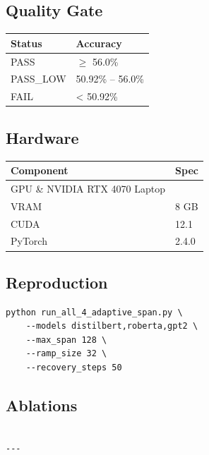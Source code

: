 \subsection{Quality Gate}

\begin{table}[H]
\centering
\small
\begin{tabular}{ll}
\toprule
\textbf{Status} & \textbf{Accuracy} \\
\midrule
PASS & $\ge$ 56.0\% \\
PASS\_LOW & 50.92\% -- 56.0\% \\
FAIL & < 50.92\% \\
\bottomrule
\end{tabular}
\end{table}

\subsection{Hardware}

\begin{table}[H]
\centering
\small
\begin{tabular}{ll}
\toprule
\textbf{Component} & \textbf{Spec} \\
\midrule
GPU \& NVIDIA RTX 4070 Laptop \\
VRAM & 8 GB \\
CUDA & 12.1 \\
PyTorch & 2.4.0 \\
\bottomrule
\end{tabular}
\end{table}

\subsection{Reproduction}

\begin{lstlisting}
python run_all_4_adaptive_span.py \
    --models distilbert,roberta,gpt2 \
    --max_span 128 \
    --ramp_size 32 \
    --recovery_steps 50
\end{lstlisting}

\subsection{Ablations}

\begin{lstlisting}

---
\end{lstlisting}